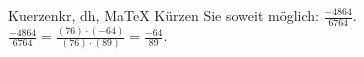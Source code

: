 \begin{MAufgabe}{Kuerzen}{kr, dh, MaTeX}
K\"urzen Sie soweit m\"oglich: $\frac{-4864}{6764}$.\\ 
\ifLsg\MLoesung
\quad $\frac{-4864}{6764}=\frac{(76)\cdot(-64)}{(76)\cdot(89)}=\frac{-64}{89}$.\else\relax\fi
 \end{MAufgabe}